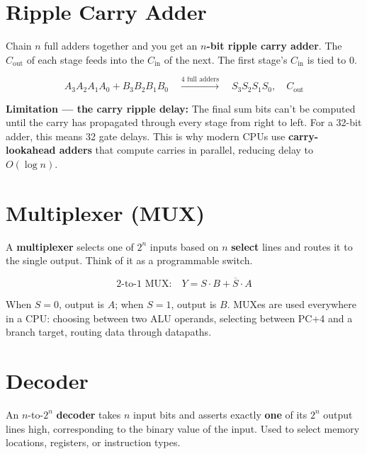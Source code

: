 \documentclass[11pt, letterpaper]{article}
\begin{document}
\section*{Ripple Carry Adder}

Chain $n$ full adders together and you get an \textbf{$n$-bit ripple carry adder}. The $C_{\mathrm{out}}$ of each stage feeds into the $C_{\mathrm{in}}$ of the next. The first stage's $C_{\mathrm{in}}$ is tied to 0.

\[
  A_3A_2A_1A_0 + B_3B_2B_1B_0
  \quad\xrightarrow{\text{4 full adders}}\quad
  S_3S_2S_1S_0,\quad C_{\mathrm{out}}
\]

\begin{tcolorbox}[colback=part5bg, colframe=sectionteal, arc=3pt, boxrule=1pt]
\textbf{Limitation --- the carry ripple delay:} The final sum bits can't be computed until the carry has propagated through every stage from right to left. For a 32-bit adder, this means 32 gate delays. This is why modern CPUs use \textbf{carry-lookahead adders} that compute carries in parallel, reducing delay to $O(\log n)$.
\end{tcolorbox}

\section*{Multiplexer (MUX)}

A \textbf{multiplexer} selects one of $2^n$ inputs based on $n$ \textbf{select} lines and routes it to the single output. Think of it as a programmable switch.

\[
  \text{2-to-1 MUX:} \quad Y = S\cdot B + \overline{S}\cdot A
\]

When $S=0$, output is $A$; when $S=1$, output is $B$. MUXes are used everywhere in a CPU: choosing between two ALU operands, selecting between PC+4 and a branch target, routing data through datapaths.

\section*{Decoder}

An $n$-to-$2^n$ \textbf{decoder} takes $n$ input bits and asserts exactly \textbf{one} of its $2^n$ output lines high, corresponding to the binary value of the input. Used to select memory locations, registers, or instruction types.
\end{document}
